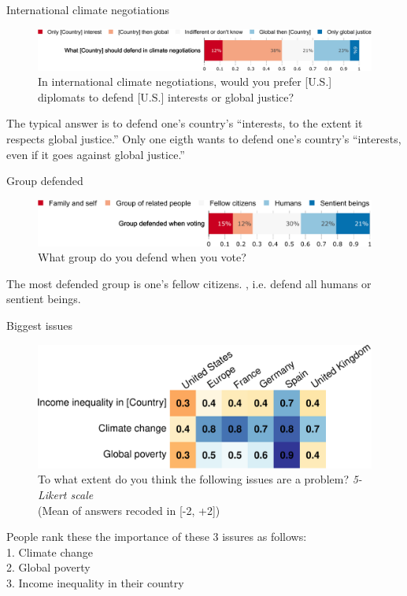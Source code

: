 \begin{framefont}{\small}
\begin{frame}{International climate negotiations\label{}}
    \begin{figure}
        \centering 
        \caption{In international climate negotiations, would you prefer [U.S.] diplomats to defend [U.S.] interests or global justice?
        }
        \vspace{-.2cm}
        \includegraphics[width=\textwidth]{../figures/all/negotiation.pdf} 
    \end{figure}
	\bbvs \ip The typical answer is to defend one's country's ``interests, to the extent it respects global justice.''
    \ip Only one eigth wants to defend one's country's ``interests, even if it goes against global justice.''
    \ee
\end{frame}

\begin{frame}{Group defended\label{}}
    \begin{figure}
        \centering 
        \caption{What group do you defend when you vote?
        }
        \vspace{-.2cm}
        \includegraphics[width=\textwidth]{../figures/all/group_defended_agg2.pdf} 
    \end{figure}
	\bbvs \ip The most defended group is one's fellow citizens.
    \ip {}, i.e. defend all humans or sentient beings.
    \ee
\end{frame}

\begin{frame}{Biggest issues\label{}}
    \begin{figure}
        \centering 
        \caption{To what extent do you think the following issues are a problem? \textit{5-Likert scale} \\(Mean of answers recoded in [-2, +2])
        }
        \vspace{-.2cm}
        \includegraphics[width=.7\textwidth]{../figures/country_comparison/problem_mean.pdf} 
    \end{figure}
	\bbvs \ip People rank these the importance of these 3 issures as follows: \\ 1. Climate change \\ 2. Global poverty \\ 3. Income inequality in their country
    \ee
\end{frame}


\end{framefont}
